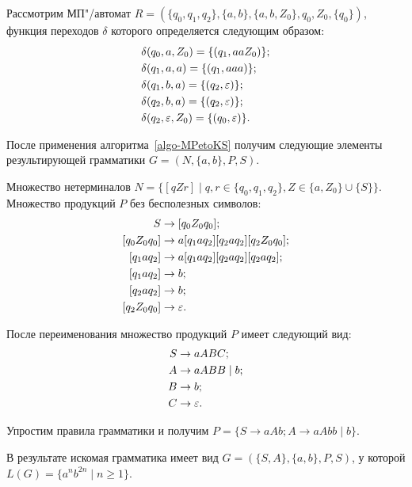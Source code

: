 \begin{myexample}
Рассмотрим МП"/автомат $R = (\{ q_0, q_1, q_2 \}, \{a, b\}, \{a, b, Z_0\}, q_0, Z_0, \{ q_0 \})$, функция переходов $\delta$ которого определяется следующим образом:
\begin{align*}
    &\delta(q_0, a, Z_0) 	= \{ (q_1, aaZ_0) \}; \\
    &\delta(q_1, a, a) 	  = \{ (q_1, aaa) \}; \\
    &\delta(q_1, b, a) 		= \{ (q_2, \varepsilon) \}; \\
    &\delta(q_2, b, a) 		= \{ (q_2, \varepsilon) \}; \\
    &\delta(q_2, \varepsilon, Z_0) 		= \{ (q_0, \varepsilon) \}. \\
\end{align*}

После применения алгоритма~\ref{algo-MPetoKS} получим следующие элементы результирующей грамматики $G = (N, \{a, b\}, P, S)$.

Множество нетерминалов $N = \{ [qZr] \mid q, r \in \{ q_0, q_1, q_2 \}, Z \in \{a, Z_0\} \cup \{S\} \}$.
Множество продукций $P$ без бесполезных символов:
\begin{align*}
    S	&\to [q_0Z_0q_0]; \\
    [q_0Z_0q_0] 	  &\to a[q_1aq_2][q_2aq_2][q_2Z_0q_0]; \\
    [q_1aq_2] 		&\to a[q_1aq_2][q_2aq_2][q_2aq_2]; \\
    [q_1aq_2] 		&\to b; \\
    [q_2aq_2] 		&\to b; \\
    [q_2Z_0q_0] 		&\to  \varepsilon. \\
\end{align*}

После переименования множество продукций $P$ имеет следующий вид:
\begin{align*}
    S	&\to aABC; \\
    A 	  &\to aABB \mid b; \\
    B 		 &\to b; \\
    C 		&\to  \varepsilon. \\
\end{align*}

Упростим правила грамматики и получим $P = \{ S \to aAb; A \to aAbb \mid b \}$.


В результате искомая грамматика имеет вид $G = (\{S, A\}, \{a, b\}, P, S)$, у которой $L(G) = \{ a^nb^{2n} \mid n \ge 1 \}$.

\end{myexample}


